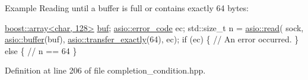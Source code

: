 \begin{DoxyParagraph}{Example}
Reading until a buffer is full or contains exactly 64 bytes\+: 
\begin{DoxyCode}
\hyperlink{classboost_1_1array}{boost::array<char, 128>} \hyperlink{namespaceasio_1_1detail_1_1descriptor__ops_ad10e658a754ff775cdcc3b3decd3c8c9}{buf};
\hyperlink{classasio_1_1error__code}{asio::error\_code} ec;
std::size\_t n = \hyperlink{group__read_ga68b2bc31177c2bf7cba974b5c65f9036}{asio::read}(
    sock, \hyperlink{group__buffer_ga1ed66e401559cbfd19595392f653b47c}{asio::buffer}(buf),
    \hyperlink{group__completion__condition_gadb2ada9400d78a5df0e5f65dd2b9967e}{asio::transfer\_exactly}(64), ec);
\textcolor{keywordflow}{if} (ec)
\{
  \textcolor{comment}{// An error occurred.}
\}
\textcolor{keywordflow}{else}
\{
  \textcolor{comment}{// n == 64}
\}
\end{DoxyCode}
 
\end{DoxyParagraph}


Definition at line 206 of file completion\+\_\+condition.\+hpp.

